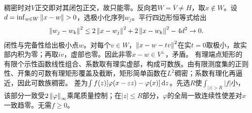 \documentclass[UTF8,fontset=fandol,11pt]{ctexart}
\begin{document}
稠密时对$V$正交即对其闭包正交，故只能零。反向若$W=\overline V\ne H$，取$x\notin W$。设$d=\inf_{w\in W}\left\lVert x-w\right\rVert>0$，选极小化序列$w_j$。平行四边形恒等式给出
\[\left\lVert w_j-w_k\right\rVert^2\le2\left\lVert x-w_j\right\rVert^2+2\left\lVert x-w_k\right\rVert^2-4d^2\to0.\]
闭性与完备性给出极小点$w$。对每个$v\in W$，$\left\lVert x-w-tv\right\rVert^2$在实$t=0$取极小，故实部内积为零；再取$iv$，虚部也零。因此非零$x-w\in V^\perp$，矛盾。
有理端点矩形的有限个示性函数线性组合、系数取有理实虚部，构成可数族。由有限测度集的正则性、开集的可数有理矩形覆盖及截断，矩形简单函数在$L^2$稠密；系数有理化再逼近，因此可数族稠密。
差为$\int f(z)[\varphi(x-\varepsilon z)-\varphi(x)]\,\mathrm d z$。先选$R$使$\int_{|z|>R}|f|$小，该部分一致受$2\left\lVert\varphi\right\rVert_\infty$乘尾质量控制；在$|z|\le R$部分，$\varphi$的全局一致连续性使差对$x$一致趋零。无需$f\ge0$。

\end{document}
